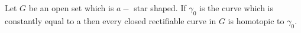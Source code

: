 Let $G$ be an open set which is $a-$ star shaped. If $\gamma_0$ is the curve which is constantly equal to a then every closed rectifiable curve in $G$ is homotopic to $\gamma_0$.